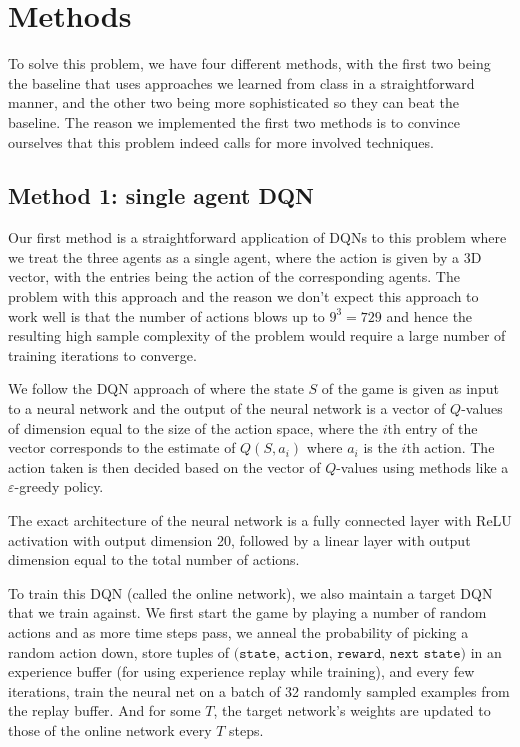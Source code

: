 \documentclass{article}
\begin{document}
\section{Methods}

To solve this problem, we have four different methods, with the
first two being the baseline that uses approaches we learned
from class in a straightforward manner, and the other two being
more sophisticated so they can beat the baseline. The
reason we implemented the first two methods is to
convince ourselves that
this problem indeed calls for more involved techniques.


\subsection{Method 1: single agent DQN}
Our first method is a straightforward application of
DQNs to this
problem where we treat the three agents as a single agent,
where the action is given by a 3D vector, with the
entries being the action of the corresponding agents.
The problem with this approach and the reason we don't expect
this approach to work well is that the number of actions blows
up to $9^3=729$ and hence the resulting high sample complexity
of the problem would require a large number of training
iterations to converge.

We follow the DQN approach of \cite{mnih2013playing}
where the state $S$ of the game is given as input to a
neural network and the output of the neural network
is a vector of $Q$-values of dimension equal to the
size of the action space, where the $i$th entry of the
vector corresponds to the estimate of $Q(S,a_i)$ where $a_i$
is the $i$th action. The action taken is then decided
based on the vector of $Q$-values using methods like
a $\varepsilon$-greedy policy.

The exact architecture of the neural network is
a fully connected layer with ReLU activation
with output dimension 20, followed by
a linear layer with output dimension
equal to the total number of actions.

To train this DQN (called the online network), we also maintain
a target DQN that we train against. We first start the game
by playing a number of random actions and as
more time steps pass, we anneal the
probability of picking a random action down,
store tuples of
$\texttt{(state, action, reward, next state)}$
in an experience buffer (for using experience
replay while training), and every few iterations,
train the neural net on a batch of 32 randomly
sampled examples from the replay buffer. And
for some $T$, the target network's weights
are updated to those of the online network every
$T$ steps.
\end{document}
